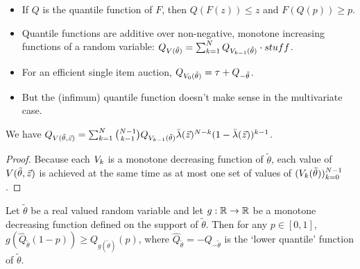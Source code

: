 \begin{itemize}

  \item If $Q$ is the quantile function of $F$, then $Q(F(z))\leq z$ and $F(Q(p))\geq p$.
  \item Quantile functions are additive over non-negative, monotone increasing functions of a random variable: $Q_{V(\tilde\theta)} = \sum_{k=1}^N Q_{V_{k-1}(\tilde\theta)} \cdot stuff$.
  \item For an efficient single item auction, $Q_{V_0(\tilde\theta)} = \tau + Q_{-\tilde\theta}$.
  \item But the (infimum) quantile function doesn't make sense in the multivariate case.

\end{itemize}


\begin{lemma}

  \label{thm:quantile-sum}

  We have $Q_{V(\tilde\theta,\vec{z})} = \sum_{k=1}^N { N-1 \choose k-1 } Q_{V_{k-1}(\tilde\theta)} \bar\lambda(\vec{z})^{N-k} (1-\bar\lambda(\vec{z}))^{k-1}$.

\end{lemma}
%
\begin{proof}

  Because each $V_k$ is a monotone decreasing function of $\tilde\theta$, each value of $V(\tilde\theta,\vec{z})$ is achieved at the same time as at most one set of values of $(V_k(\tilde\theta))_{k=0}^{N-1}$. \qedhere

\end{proof}


\begin{lemma}

  Let $\tilde\theta$ be a real valued random variable and let $g:\mathbb{R}\rightarrow\mathbb{R}$ be a monotone decreasing function defined on the support of $\tilde\theta$.
  Then for any $p\in[0,1]$, $g(\hat Q_{\tilde\theta}(1-p)) \geq Q_{g(\tilde\theta)}(p)$, where $\hat Q_{\tilde\theta} = -Q_{-\tilde\theta}$ is the `lower quantile' function of $\tilde\theta$.

\end{lemma}

\printbibliography